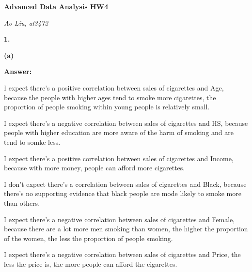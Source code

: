 \documentclass[letterpaper,11pt]{article}
\begin{document}
\begin{center}
	\textbf{\Huge{Advanced Data Analysis HW4}}
\end{center}

\begin{center}
	\textsl{Ao Liu, al3472}
\end{center}

\bigbreak
\bigbreak
\bigbreak



\begin{addmargin}[-2em]{0em}
  \large{\textbf{1. }}
\end{addmargin}

\begin{addmargin}[-1.1em]{0em}
  \textbf{(a)}\par
\end{addmargin}
\textbf{}\par
\bigbreak
\begin{addmargin}[-0.5em]{0em}
  \textbf{Answer: }
\end{addmargin}

I expect there's a positive correlation between sales of cigarettes and Age, because the people with higher ages tend to smoke more cigarettes, the proportion of people smoking within young people is relatively small.\par
I expect there's a negative correlation between sales of cigarettes and HS, because people with higher education are more aware of the harm of smoking and are tend to somke less.\par
I expect there's a positive correlation between sales of cigarettes and Income, because with more money, people can afford more cigarettes.\par
I don't expect there's a correlation between sales of cigarettes and Black, because there's no supporting evidence that black people are mode likely to smoke more than others.\par
I expect there's a negative correlation between sales of cigarettes and Female, because there are a lot more men smoking than women, the higher the proportion of the women, the less the proportion of people smoking.\par
I expect there's a negative correlation between sales of cigarettes and Price, the less the price is, the more people can afford the cigarettes.\par
\end{document}
